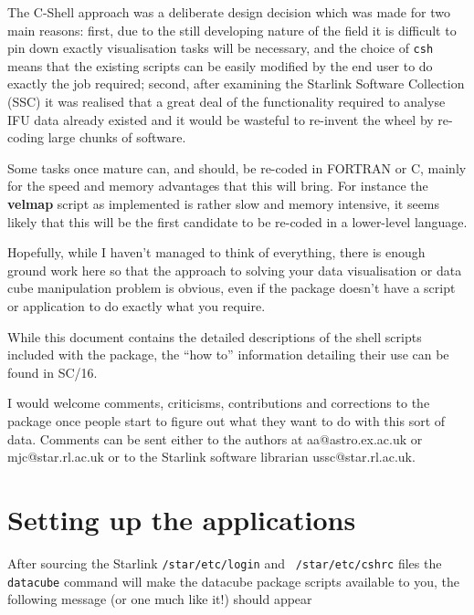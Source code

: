 \documentclass[twoside,11pt]{article}
\newcommand{\htmladdnormallink}[2]{#1}
\newcommand{\htmlref}[2]{#1}
\newcommand{\xref}[3]{#1}
\newcommand{\xlabel}[1]{}
\begin{document}
The C-Shell approach was a deliberate design decision which was made
for two main reasons: first, due to the still developing nature of
the field it is difficult to pin down exactly visualisation tasks will
be necessary, and the choice of {\tt csh} means that the existing
scripts can be easily modified by the end user to do exactly the job
required; second, after examining the Starlink Software Collection
(SSC) it was realised that a great deal of the functionality required
to analyse IFU data already existed and it would be wasteful to
re-invent the wheel by re-coding large chunks of software.

Some tasks once mature can, and should, be re-coded in FORTRAN or C,
mainly for the speed and memory advantages that this will bring. For
instance the \htmlref{{\bf velmap}}{velmap} script as implemented is
rather slow and memory intensive, it seems likely that this will be
the first candidate to be re-coded in a lower-level language.

Hopefully, while I haven't managed to think of everything, there is
enough ground work here so that the approach to solving your data
visualisation or data cube manipulation problem is obvious, even if
the package doesn't have a script or application to do exactly what
you require.

While this document contains the detailed descriptions of the shell
scripts included with the package, the ``how to'' information
detailing their use can be found in \xref{SC/16}{sc16}{}.

I would welcome comments, criticisms, contributions and corrections to
the package once people start to figure out what they want to do with
this sort of data.  Comments can be sent either to the authors at
\htmladdnormallink{aa@astro.ex.ac.uk}{mailto:aa@astro.ex.ac.uk} or
\htmladdnormallink{mjc@star.rl.ac.uk}{mailto:mjc@star.rl.ac.uk} or
to the Starlink software librarian
\htmladdnormallink{ussc@star.rl.ac.uk}{mailto:ussc@star.rl.ac.uk}.

\section{\xlabel{sun237_starting}Setting up the applications\label{sun237_starting}}

After sourcing the Starlink {\tt /star/etc/login} and {\tt
/star/etc/cshrc} files the {\tt datacube} command will make the
datacube package scripts available to you, the following
message (or one much like it!) should appear
\end{document}
